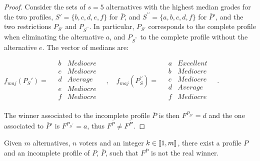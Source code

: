 \documentclass[version=3.21, pagesize, twoside=off, bibliography=totoc, DIV=calc, fontsize=12pt, a4paper]{scrartcl}
\begin{document}
\begin{proof}
	Consider the sets of $s=5$ alternatives with the highest median grades for the two profiles, $S'=\{b,c,d,e,f\}$ for $\bar{P}$, and $S^{\prime\prime}=\{a,b,c,d,f\}$ for $\bar{P}'$, and the two restrictions $P_{S'}$ and $P_{S^{\prime\prime}}$. In particular, $P_{S'}$ corresponds to the complete profile when eliminating the alternative $a$, and $P_{S^{\prime\prime}}$ to the complete profile without the alternative $e$.
	The vector of medians are:
	\begin{center}
		$f_{maj}(P_S')= \quad
		\begin{array}{cc}
			b &	Mediocre \\
			c &	Mediocre \\
			d &	Average	\\
			e &	Mediocre \\
			f & Mediocre \\
		\end{array} \quad,\quad%
		f_{maj}(P_S^{\prime\prime})= \quad
		\begin{array}{cc}
			a & Excellent \\
			b &	Mediocre \\
			c &	Mediocre \\
			d &	Average	\\
			f & Mediocre \\
		\end{array} \quad.
		$
	\end{center}
	The winner associated to the incomplete profile $\bar{P}$ is then $F^{P_{S'}} = d$ and the one associated to $\bar{P}'$ is $F^{P_{S^{\prime\prime}}} = a$, thus $F^{\bar{P}} \neq F^{\bar{P}'}$.
\end{proof}

\begin{corollary}
	Given $m$ alternatives, $n$ voters and an integer $k \in \llbracket1,m\rrbracket$, there exist a profile $P$ and an incomplete profile of $P$, $\bar{P}$, such that $F^{\bar{P}}$ is not the real winner.
\end{corollary}

\newpage
\end{document}
